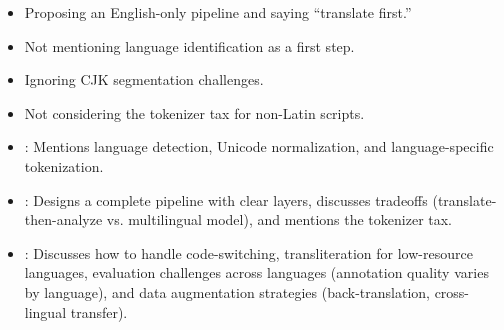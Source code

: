 \begin{interviewq}
\redflags
\begin{itemize}
    \item Proposing an English-only pipeline and saying ``translate first.''
    \item Not mentioning language identification as a first step.
    \item Ignoring CJK segmentation challenges.
    \item Not considering the tokenizer tax for non-Latin scripts.
\end{itemize}


\goodgreat
\begin{itemize}
    \item {}: Mentions language detection, Unicode normalization, and
    language-specific tokenization.
    \item {}: Designs a complete pipeline with clear layers, discusses
    tradeoffs (translate-then-analyze vs. multilingual model), and mentions the tokenizer
    tax.
    \item {}: Discusses how to handle code-switching, transliteration for
    low-resource languages, evaluation challenges across languages (annotation quality
    varies by language), and data augmentation strategies (back-translation, cross-lingual
    transfer).
\end{itemize}

\end{interviewq}

\vspace{0.5em}

